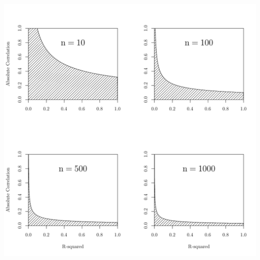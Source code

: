 \documentclass[12pt]{article}\usepackage[]{graphicx}\usepackage[]{color}
\makeatletter
\def\maxwidth{ %
  \ifdim\Gin@nat@width>\linewidth
    \linewidth
  \else
    \Gin@nat@width
  \fi
}
\newenvironment{knitrout}{}{} %
\theoremstyle{definition}
\makeatother
\begin{document}
\begin{knitrout}
\color{fgcolor}
\includegraphics[width=\maxwidth]{figure/OLSboundary} 

\end{knitrout}
\end{document}
